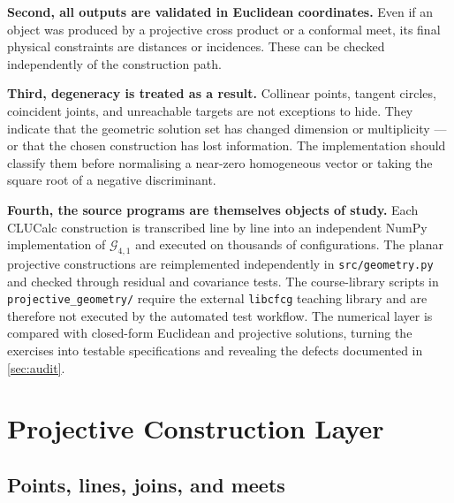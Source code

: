 \documentclass[11pt,a4paper]{article}
\theoremstyle{plain}
\theoremstyle{definition}
\theoremstyle{remark}
\newcommand{\GA}{\mathcal{G}_{4,1}}
\begin{document}
\textbf{Second, all outputs are validated in Euclidean coordinates.} Even if an
object was produced by a projective cross product or a conformal meet, its
final physical constraints are distances or incidences. These can be checked
independently of the construction path.

\textbf{Third, degeneracy is treated as a result.} Collinear points, tangent
circles, coincident joints, and unreachable targets are not exceptions to hide.
They indicate that the geometric solution set has changed dimension or
multiplicity --- or that the chosen construction has lost information. The
implementation should classify them before normalising a near-zero homogeneous
vector or taking the square root of a negative discriminant.

\textbf{Fourth, the source programs are themselves objects of study.} Each
CLUCalc construction is transcribed line by line into an independent NumPy
implementation of $\GA$ and executed on thousands of configurations. The planar
projective constructions are reimplemented independently in
\texttt{src/geometry.py} and checked through residual and covariance tests. The
course-library scripts in \texttt{projective\_geometry/} require the external
\texttt{libcfcg} teaching library and are therefore not executed by the
automated test workflow. The numerical layer is compared with closed-form
Euclidean and projective solutions, turning the exercises into testable
specifications and revealing the defects documented in \cref{sec:audit}.

\section{Projective Construction Layer}\label{sec:projective}

\subsection{Points, lines, joins, and meets}
\end{document}
